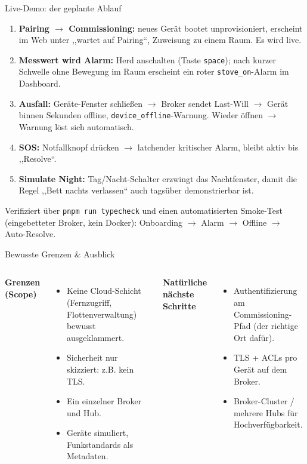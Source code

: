 \documentclass[aspectratio=169,11pt]{beamer}
\begin{document}
\begin{frame}{Live-Demo: der geplante Ablauf}
  \begin{enumerate}
    \item \textbf{Pairing $\rightarrow$ Commissioning:} neues Ger\"at bootet unprovisioniert,
          erscheint im Web unter ,,wartet auf Pairing``, Zuweisung zu einem Raum. Es wird live.
    \item \textbf{Messwert wird Alarm:} Herd anschalten (Taste \texttt{space}); nach kurzer
          Schwelle ohne Bewegung im Raum erscheint ein roter \texttt{stove\_on}-Alarm im Dashboard.
    \item \textbf{Ausfall:} Ger\"ate-Fenster schlie\ss en $\rightarrow$ Broker sendet Last-Will
          $\rightarrow$ Ger\"at binnen Sekunden offline, \texttt{device\_offline}-Warnung.
          Wieder \"offnen $\rightarrow$ Warnung l\"ost sich automatisch.
    \item \textbf{SOS:} Notfallknopf dr\"ucken $\rightarrow$ latchender kritischer Alarm,
          bleibt aktiv bis ,,Resolve``.
    \item \textbf{Simulate Night:} Tag/Nacht-Schalter erzwingt das Nachtfenster, damit die
          Regel ,,Bett nachts verlassen`` auch tags\"uber demonstrierbar ist.
  \end{enumerate}
  \vspace{0.4em}
  {\small Verifiziert \"uber \texttt{pnpm run typecheck} und einen automatisierten
  Smoke-Test (eingebetteter Broker, kein Docker): Onboarding $\rightarrow$ Alarm
  $\rightarrow$ Offline $\rightarrow$ Auto-Resolve.}
\end{frame}

\begin{frame}{Bewusste Grenzen \& Ausblick}
  \begin{columns}[T]
      \textbf{Grenzen (Scope)}
      \begin{itemize}
        \item Keine Cloud-Schicht (Fernzugriff, Flottenverwaltung) bewusst ausgeklammert.
        \item Sicherheit nur skizziert: z.B. kein TLS.
        \item Ein einzelner Broker und Hub.
        \item Ger\"ate simuliert, Funkstandards als Metadaten.
      \end{itemize}
      \textbf{Nat\"urliche n\"achste Schritte}
      \begin{itemize}
        \item Authentifizierung am Commissioning-Pfad (der richtige Ort daf\"ur).
        \item TLS + ACLs pro Ger\"at auf dem Broker.
        \item Broker-Cluster / mehrere Hubs f\"ur Hochverf\"ugbarkeit.
      \end{itemize}
  \end{columns}
\end{frame}
\end{document}
